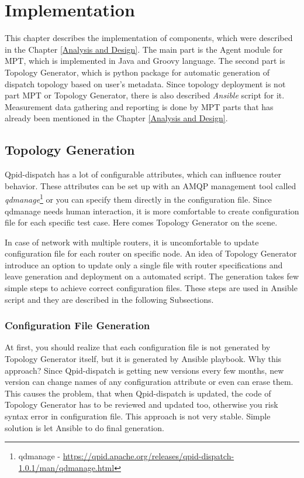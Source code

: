 \chapter{Implementation}
\label{Implementation}
This chapter describes the implementation of components, which were described in the Chapter \ref{Analysis and Design}. The main part is the Agent module for MPT, which is implemented in Java and Groovy language. The second part is Topology Generator, which is python package for automatic generation of dispatch topology based on user's metadata. Since topology deployment is not part MPT or Topology Generator, there is also described \emph{Ansible} script for it. Measurement data gathering and reporting is done by MPT parts that has already been mentioned in the Chapter \ref{Analysis and Design}.

\section{Topology Generation}
Qpid-dispatch has a lot of configurable attributes, which can influence router behavior. These attributes can be set up with an AMQP management tool called \emph{qdmanage}\footnote{qdmanage - \url{https://qpid.apache.org/releases/qpid-dispatch-1.0.1/man/qdmanage.html}} or you can specify them directly in the configuration file. Since qdmanage needs human interaction, it is more comfortable to create configuration file for each specific test case. Here comes Topology Generator on the scene.

In case of network with multiple routers, it is uncomfortable to update configuration file for each router on specific node. An idea of Topology Generator introduce an option to update only a single file with router specifications and leave generation and deployment on a automated script. The generation takes few simple steps to achieve correct configuration files. These steps are used in Ansible script and they are described in the following Subsections.

\subsection{Configuration File Generation}
At first, you should realize that each configuration file is not generated by Topology Generator itself, but it is generated by Ansible playbook. Why this approach? Since Qpid-dispatch is getting new versions every few months, new version can change names of any configuration attribute or even can erase them. This causes the problem, that when Qpid-dispatch is updated, the code of Topology Generator has to be reviewed and updated too, otherwise you risk syntax error in configuration file. This approach is not very stable. Simple solution is let Ansible to do final generation.

